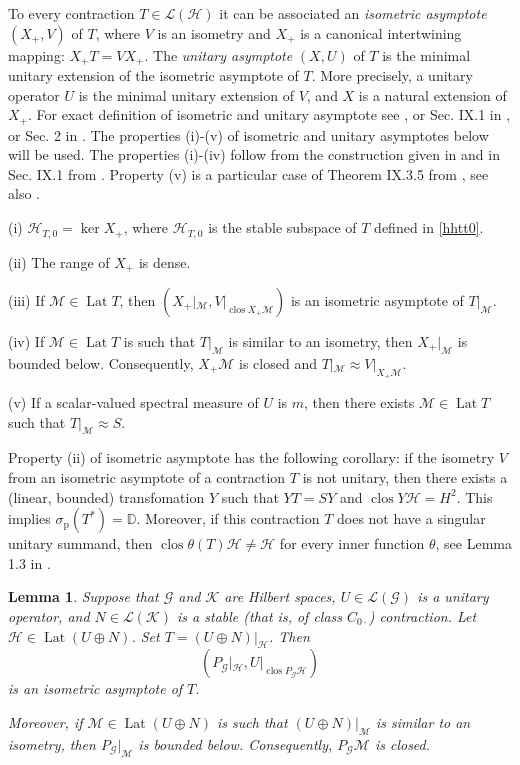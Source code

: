 \documentclass[a4paper,oneside,11pt]{amsart}
\numberwithin{equation}{section}
\theoremstyle{plain}
\newtheorem{lemma}[theorem]{Lemma}
\theoremstyle{definition}
\begin{document}
To every contraction $T\in\mathcal L(\mathcal H)$ it can be associated an \emph{isometric asymptote} $(X_+, V)$ of $T$, 
where $V$ is an isometry and $X_+$ is a canonical intertwining mapping: $X_+T=VX_+$. The \emph{unitary asymptote} 
$(X,U)$ of $T$  is the minimal unitary extension of 
the  isometric asymptote of $T$. More precisely, a unitary operator $U$ is  the minimal unitary extension of $V$, 
and $X$ is a natural extension of $X_+$. For exact definition of isometric and unitary asymptote 
 see  \cite{k89}, or Sec. IX.1 in  \cite{sznfbk}, or Sec. 2 in \cite{k16}. 
The properties (i)-(v) of isometric and unitary asymptotes below will be used. The properties (i)-(iv) follow from the construction given in 
 \cite{k89} and in Sec. IX.1 from \cite{sznfbk}. Property (v) is a particular case of Theorem IX.3.5 from \cite{sznfbk}, see also \cite{k07}. 

(i) $\mathcal H_{T,0}=\ker X_+$, where $\mathcal H_{T,0}$ is the stable subspace of $T$ defined in \eqref{hhtt0}.

(ii) The range of $X_+$ is dense.

(iii) If $\mathcal M\in\operatorname{Lat}T$, then  $(X_+|_{\mathcal M}, V|_{\operatorname{clos}X_+\mathcal M})$ 
is an isometric asymptote of $T|_{\mathcal M}$.

(iv) If $\mathcal M\in\operatorname{Lat}T$ is such that $T|_{\mathcal M}$ is similar to an isometry, 
then  $X_+|_{\mathcal M}$ is bounded below. Consequently,  $X_+\mathcal M$ is closed and 
$T|_{\mathcal M}\approx V|_{X_+\mathcal M}$. 

(v) If a scalar-valued spectral measure of $U$ is $m$, then there exists  
$\mathcal M\in\operatorname{Lat}T$  such that $T|_{\mathcal M}\approx S$.  

Property (ii) of isometric asymptote has the following corollary: 
if the isometry $V$ from an isometric asymptote of a contraction $T$ is not unitary, 
then there exists a (linear, bounded) transfomation $Y$ such that $YT=SY$ and 
 $\operatorname{clos}Y\mathcal H=H^2$. This implies $\sigma_{\mathrm{p}}(T^*)=\mathbb D$. 
Moreover, if this  contraction $T$ does not have a singular unitary summand, then 
$\operatorname{clos}\theta(T)\mathcal H\neq\mathcal H$ for every inner function $\theta$, see Lemma 1.3 in \cite{g19}.

\begin{lemma}\label{asymptote} Suppose that  $\mathcal G$ and $\mathcal K$ are Hilbert spaces, 
$U\in \mathcal L(\mathcal G)$ is a unitary operator, and $N\in \mathcal L(\mathcal K)$ is 
a stable (that is, of class $C_{0\cdot}$) contraction. 
Let $\mathcal H\in\operatorname{Lat}(U\oplus N)$. Set $T=(U\oplus N)|_{\mathcal H}$. Then 
\begin{equation*} (P_{\mathcal G}|_{\mathcal H}, U|_{\operatorname{clos}P_{\mathcal G}\mathcal H})
 \end{equation*}
is an isometric asymptote of $T$.

Moreover, if $\mathcal M\in\operatorname{Lat}(U\oplus N)$ 
is such that  $(U\oplus N)|_{\mathcal M}$ is similar to an isometry, then
$P_{\mathcal G}|_{\mathcal M}$ is bounded below.  Consequently, $P_{\mathcal G}{\mathcal M}$ is closed.  
\end{lemma}
\end{document}
